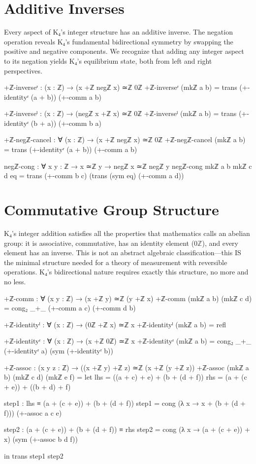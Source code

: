 \documentclass[11pt,a4paper]{book}
\begin{document}
\section{Additive Inverses}

Every aspect of K₄'s integer structure has an additive inverse. The negation operation reveals K₄'s fundamental bidirectional symmetry by swapping the positive and negative components. We recognize that adding any integer aspect to its negation yields K₄'s equilibrium state, both from left and right perspectives.

\begin{code}
+ℤ-inverseʳ : (x : ℤ) → (x +ℤ negℤ x) ≃ℤ 0ℤ
+ℤ-inverseʳ (mkℤ a b) = trans (+-identityʳ (a + b)) (+-comm a b)

+ℤ-inverseˡ : (x : ℤ) → (negℤ x +ℤ x) ≃ℤ 0ℤ
+ℤ-inverseˡ (mkℤ a b) = trans (+-identityʳ (b + a)) (+-comm b a)

+ℤ-negℤ-cancel : ∀ (x : ℤ) → (x +ℤ negℤ x) ≃ℤ 0ℤ
+ℤ-negℤ-cancel (mkℤ a b) = trans (+-identityʳ (a + b)) (+-comm a b)

negℤ-cong : ∀ {x y : ℤ} → x ≃ℤ y → negℤ x ≃ℤ negℤ y
negℤ-cong {mkℤ a b} {mkℤ c d} eq = 
  trans (+-comm b c) (trans (sym eq) (+-comm a d))
\end{code}

\section{Commutative Group Structure}

K₄'s integer addition satisfies all the properties that mathematics calls an abelian group: it is associative, commutative, has an identity element ($0\mathbb{Z}$), and every element has an inverse. This is not an abstract algebraic classification—this IS the minimal structure needed for a theory of measurement with reversible operations. K₄'s bidirectional nature requires exactly this structure, no more and no less.

\begin{code}
+ℤ-comm : ∀ (x y : ℤ) → (x +ℤ y) ≃ℤ (y +ℤ x)
+ℤ-comm (mkℤ a b) (mkℤ c d) = 
  cong₂ _+_ (+-comm a c) (+-comm d b)

+ℤ-identityˡ : ∀ (x : ℤ) → (0ℤ +ℤ x) ≃ℤ x
+ℤ-identityˡ (mkℤ a b) = refl

+ℤ-identityʳ : ∀ (x : ℤ) → (x +ℤ 0ℤ) ≃ℤ x
+ℤ-identityʳ (mkℤ a b) = cong₂ _+_ (+-identityʳ a) (sym (+-identityʳ b))

+ℤ-assoc : (x y z : ℤ) → ((x +ℤ y) +ℤ z) ≃ℤ (x +ℤ (y +ℤ z))
+ℤ-assoc (mkℤ a b) (mkℤ c d) (mkℤ e f) = 
  let
    lhs = ((a + c) + e) + (b + (d + f))
    rhs = (a + (c + e)) + ((b + d) + f)
    
    step1 : lhs ≡ (a + (c + e)) + (b + (d + f))
    step1 = cong (λ x → x + (b + (d + f))) (+-assoc a c e)
    
    step2 : (a + (c + e)) + (b + (d + f)) ≡ rhs
    step2 = cong (λ x → (a + (c + e)) + x) (sym (+-assoc b d f))
    
  in trans step1 step2
\end{code}
\end{document}
